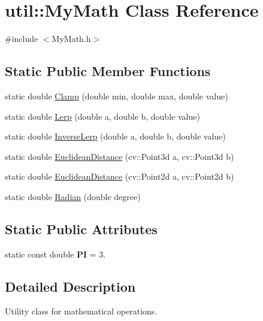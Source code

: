 \hypertarget{classutil_1_1MyMath}{}\section{util\+:\+:My\+Math Class Reference}
\label{classutil_1_1MyMath}


{\ttfamily \#include $<$My\+Math.\+h$>$}

\subsection*{Static Public Member Functions}
\begin{DoxyCompactItemize}
\item 
static double \hyperlink{classutil_1_1MyMath_a367a261dc52a85cc97ba376799ed13a3}{Clamp} (double min, double max, double value)
\item 
static double \hyperlink{classutil_1_1MyMath_ae68f361889a9929767b0c85ad7a010f1}{Lerp} (double a, double b, double value)
\item 
static double \hyperlink{classutil_1_1MyMath_a789c283b324494ab50955af1e35178d5}{Inverse\+Lerp} (double a, double b, double value)
\item 
static double \hyperlink{classutil_1_1MyMath_abaf214b2fc7a31e43cf07245cf4b2e1f}{Euclidean\+Distance} (cv\+::\+Point3d a, cv\+::\+Point3d b)
\item 
static double \hyperlink{classutil_1_1MyMath_a1e70b6714c4c2c0bf22ede78db7118f2}{Euclidean\+Distance} (cv\+::\+Point2d a, cv\+::\+Point2d b)
\item 
static double \hyperlink{classutil_1_1MyMath_aab093b6bf8f989a0d1879ce382e762af}{Radian} (double degree)
\end{DoxyCompactItemize}
\subsection*{Static Public Attributes}
\begin{DoxyCompactItemize}
\item 
static const double {\bfseries PI} = 3.\hypertarget{classutil_1_1MyMath_a0102b31b23c28614b0b48b1e53d23135}{}\label{classutil_1_1MyMath_a0102b31b23c28614b0b48b1e53d23135}

\end{DoxyCompactItemize}


\subsection{Detailed Description}
Utility class for mathematical operations. 

